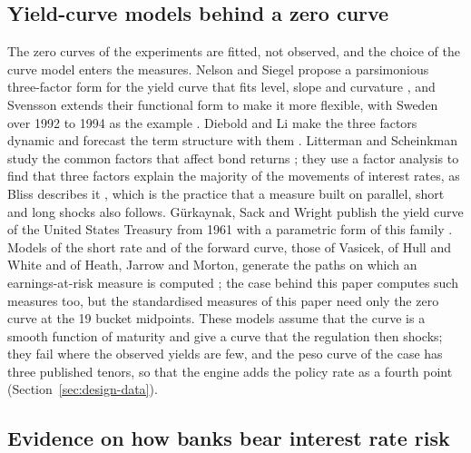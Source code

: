 \subsection{Yield-curve models behind a zero curve}
\label{sec:rw-curves}

The zero curves of the experiments are fitted, not observed, and the choice of the curve model enters the measures. Nelson and Siegel propose a parsimonious three-factor form for the yield curve that fits level, slope and curvature \citep{Nelson1987}, and Svensson extends their functional form to make it more flexible, with Sweden over 1992 to 1994 as the example \citep{Svensson1994}. Diebold and Li make the three factors dynamic and forecast the term structure with them \citep{Diebold2006}. Litterman and Scheinkman study the common factors that affect bond returns \citep{Litterman1991}; they use a factor analysis to find that three factors explain the majority of the movements of interest rates, as Bliss describes it \citep{Bliss1997}, which is the practice that a measure built on parallel, short and long shocks also follows. G\"urkaynak, Sack and Wright publish the yield curve of the United States Treasury from 1961 with a parametric form of this family \citep{Gurkaynak2007}. Models of the short rate and of the forward curve, those of Vasicek, of Hull and White and of Heath, Jarrow and Morton, generate the paths on which an earnings-at-risk measure is computed \citep{Vasicek1977,Hull1990,Heath1992}; the case behind this paper computes such measures too, but the standardised measures of this paper need only the zero curve at the 19 bucket midpoints. These models assume that the curve is a smooth function of maturity and give a curve that the regulation then shocks; they fail where the observed yields are few, and the peso curve of the case has three published tenors, so that the engine adds the policy rate as a fourth point (Section~\ref{sec:design-data}).

\subsection{Evidence on how banks bear interest rate risk}
\label{sec:rw-banks}

